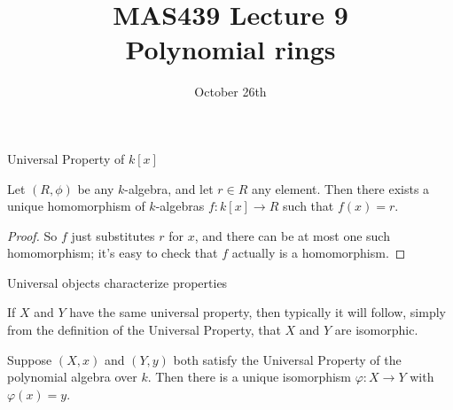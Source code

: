 \documentclass{beamer}
\title{MAS439 Lecture 9 \\ Polynomial rings}
\date{October 26th}
\begin{document}
\begin{frame}
\titlepage
\end{frame}

\begin{frame}{Universal Property of $k[x]$}

\begin{lemma} Let $(R,\phi)$ be any $k$-algebra, and let $r\in R$ any element.  Then there exists a unique homomorphism of $k$-algebras $f:k[x]\to R$ such that $f(x)=r$.
\end{lemma}
\begin{proof}
So $f$ just substitutes $r$ for $x$, and there can be at most one such homomorphism; it's easy to check that $f$ actually is a homomorphism.
\end{proof}

\end{frame}








\begin{frame}{Universal objects characterize properties}

If $X$ and $Y$ have the same universal property, then typically it will follow, simply from the definition of the Universal Property, that $X$ and $Y$ are isomorphic.

\begin{lemma} Suppose $(X,x)$ and $(Y,y)$ both satisfy the Universal Property of the polynomial algebra over $k$.  Then there is a unique isomorphism $\varphi:X\to Y$ with $\varphi(x)=y$.
\end{lemma}

\end{frame}
\end{document}
